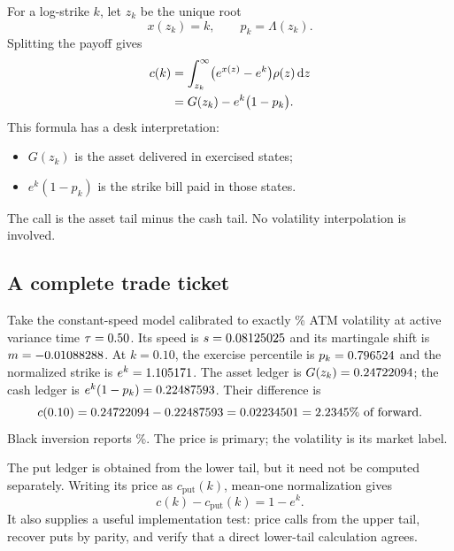 \documentclass[11pt]{article}
\begin{document}
For a log-strike $k$, let $z_k$ be the unique root
\begin{equation}
x(z_k)=k,\qquad p_k=\Lambda(z_k).
\label{eq:strike_root}
\end{equation}
Splitting the payoff gives
\begin{align}
c(k)
&=\int_{z_k}^{\infty}
  \bigl(e^{x(z)}-e^k\bigr)\rho(z)\,\mathrm{d} z \notag\\
&=G(z_k)-e^k\bigl(1-p_k\bigr).
\label{eq:call_ledger}
\end{align}
This formula has a desk interpretation:
\begin{itemize}[leftmargin=1.4em]
\item $G(z_k)$ is the asset delivered in exercised states;
\item $e^k(1-p_k)$ is the strike bill paid in those states.
\end{itemize}
The call is the asset tail minus the cash tail.  No volatility interpolation is
involved.

\subsection{A complete trade ticket}

\begin{example}[title={A six-month call at $k=0.10$}]
\label{ex:call_ticket}
Take the constant-speed model calibrated to exactly
\lqdfreshtoyatm\% ATM volatility at active variance time
$\tau=0.50$.  Its speed is
$s=0.08125025$ and its martingale shift is
$m=-0.01088288$.  At $k=0.10$, the exercise percentile is
$p_k=0.796524$ and the normalized strike is
$e^k=1.105171$.  The asset ledger is
$G(z_k)=0.24722094$; the cash ledger is
$e^k(1-p_k)=0.22487593$.  Their difference is
\[
c(0.10)
=0.24722094-0.22487593
=0.02234501
       =2.2345\%\ \text{of forward}.
\]
Black inversion reports \lqdfreshtoyivten\%.  The price is primary; the
volatility is its market label.
\end{example}

The put ledger is obtained from the lower tail, but it need not be computed
separately.  Writing its price as $c_{\mathrm{put}}(k)$, mean-one
normalization gives
\begin{equation}
c(k)-c_{\mathrm{put}}(k)=1-e^k.
\label{eq:parity}
\end{equation}
It also supplies a useful implementation test: price calls from the upper
tail, recover puts by parity, and verify that a direct lower-tail calculation
agrees.
\end{document}
